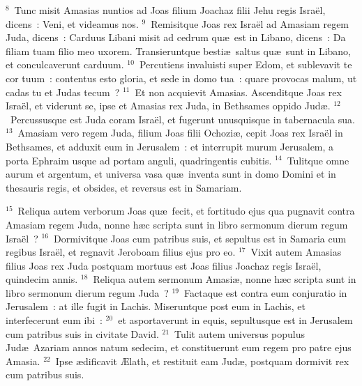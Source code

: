 ${}^{8}$~Tunc misit Amasias nuntios ad Joas filium Joachaz filii Jehu regis Isra\"el, dicens~: Veni, et videamus nos.
${}^{9}$~Remisitque Joas rex Isra\"el ad Amasiam regem Juda, dicens~: Carduus Libani misit ad cedrum qu\ae\ est in Libano, dicens~: Da filiam tuam filio meo uxorem. Transieruntque besti\ae\ saltus qu\ae\ sunt in Libano, et conculcaverunt carduum.
${}^{10}$~Percutiens invaluisti super Edom, et sublevavit te cor tuum~: contentus esto gloria, et sede in domo tua~: quare provocas malum, ut cadas tu et Judas tecum~?
${}^{11}$~Et non acquievit Amasias. Ascenditque Joas rex Isra\"el, et viderunt se, ipse et Amasias rex Juda, in Bethsames oppido Jud\ae .
${}^{12}$~Percussusque est Juda coram Isra\"el, et fugerunt unusquisque in tabernacula sua.
${}^{13}$~Amasiam vero regem Juda, filium Joas filii Ochozi\ae , cepit Joas rex Isra\"el in Bethsames, et adduxit eum in Jerusalem~: et interrupit murum Jerusalem, a porta Ephraim usque ad portam anguli, quadringentis cubitis.
${}^{14}$~Tulitque omne aurum et argentum, et universa vasa qu\ae\ inventa sunt in domo Domini et in thesauris regis, et obsides, et reversus est in Samariam.


${}^{15}$~Reliqua autem verborum Joas qu\ae\ fecit, et fortitudo ejus qua pugnavit contra Amasiam regem Juda, nonne h\ae c scripta sunt in libro sermonum dierum regum Isra\"el~?
${}^{16}$~Dormivitque Joas cum patribus suis, et sepultus est in Samaria cum regibus Isra\"el, et regnavit Jeroboam filius ejus pro eo.
${}^{17}$~Vixit autem Amasias filius Joas rex Juda postquam mortuus est Joas filius Joachaz regis Isra\"el, quindecim annis.
${}^{18}$~Reliqua autem sermonum Amasi\ae , nonne h\ae c scripta sunt in libro sermonum dierum regum Juda~?
${}^{19}$~Factaque est contra eum conjuratio in Jerusalem~: at ille fugit in Lachis. Miseruntque post eum in Lachis, et interfecerunt eum ibi~:
${}^{20}$~et asportaverunt in equis, sepultusque est in Jerusalem cum patribus suis in civitate David.
${}^{21}$~Tulit autem universus populus Jud\ae\ Azariam annos natum sedecim, et constituerunt eum regem pro patre ejus Amasia.
${}^{22}$~Ipse \ae dificavit \AE lath, et restituit eam Jud\ae , postquam dormivit rex cum patribus suis.


